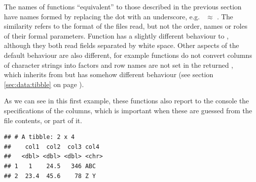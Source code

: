 \documentclass[krantz2]{krantz}\usepackage{knitr}%
\begin{document}
\begin{warningbox}
The names of functions ``equivalent'' to those described in the previous section have names formed by replacing the dot with an underscore, e.g.\  $\approx$ . The similarity refers to the format of the files read, but not the order, names or roles of their formal parameters. Function  has a slightly different behaviour to , although they both read fields separated by white space. Other aspects of the default behaviour are also different, for example  functions do not convert columns of character strings into factors and row names are not set in the returned , which inherits from  but has somehow different behaviour (see section \ref{sec:data:tibble} on page \pageref{sec:data:tibble}).
\end{warningbox}

As we can see in this first example, these functions also report to the console the specifications of the columns, which is important when these are guessed from the file contents, or part of it.

\begin{knitrout}\footnotesize
{}\color{fgcolor}\begin{kframe}
\begin{alltt}
\hlstd{(} \hlstd{=} \hlstd{)}
\end{alltt}


{\ttfamily\noindent\itshape\color{messagecolor}{\#\# Parsed with column specification:\\\#\# cols(\\\#\#\ \  col1 = col\_double(),\\\#\#\ \  col2 = col\_double(),\\\#\#\ \  col3 = col\_double(),\\\#\#\ \  col4 = col\_character()\\\#\# )}}\begin{verbatim}
## # A tibble: 2 x 4
##    col1  col2  col3 col4 
##   <dbl> <dbl> <dbl> <chr>
## 1   1    24.5   346 ABC  
## 2  23.4  45.6    78 Z Y
\end{verbatim}
\end{kframe}
\end{knitrout}
\end{document}

